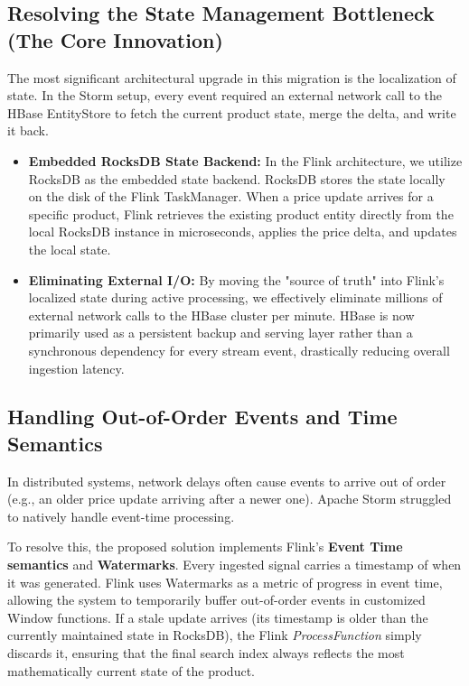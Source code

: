 \subsection{Resolving the State Management Bottleneck (The Core Innovation)}
\begin{justify}
    The most significant architectural upgrade in this migration is the localization of state. In the Storm setup, every event required an external network call to the HBase EntityStore to fetch the current product state, merge the delta, and write it back.
    
    

    \begin{itemize}
        \item \textbf{Embedded RocksDB State Backend:} In the Flink architecture, we utilize RocksDB as the embedded state backend. RocksDB stores the state locally on the disk of the Flink TaskManager. When a price update arrives for a specific product, Flink retrieves the existing product entity directly from the local RocksDB instance in microseconds, applies the price delta, and updates the local state.
        \item \textbf{Eliminating External I/O:} By moving the "source of truth" into Flink's localized state during active processing, we effectively eliminate millions of external network calls to the HBase cluster per minute. HBase is now primarily used as a persistent backup and serving layer rather than a synchronous dependency for every stream event, drastically reducing overall ingestion latency.
    \end{itemize}
\end{justify}

\subsection{Handling Out-of-Order Events and Time Semantics}
\begin{justify}
    In distributed systems, network delays often cause events to arrive out of order (e.g., an older price update arriving after a newer one). Apache Storm struggled to natively handle event-time processing.
    
    To resolve this, the proposed solution implements Flink's \textbf{Event Time semantics} and \textbf{Watermarks}. Every ingested signal carries a timestamp of when it was generated. Flink uses Watermarks as a metric of progress in event time, allowing the system to temporarily buffer out-of-order events in customized Window functions. If a stale update arrives (its timestamp is older than the currently maintained state in RocksDB), the Flink \textit{ProcessFunction} simply discards it, ensuring that the final search index always reflects the most mathematically current state of the product.
\end{justify}

